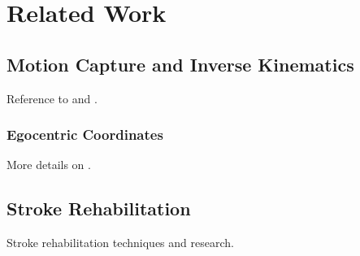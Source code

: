 
\chapter{Related Work} %

\label{Chapter2} %

\section{Motion Capture and Inverse Kinematics}

Reference to \cite{molla2013singularity} and \cite{molla2017egocentric}.

\subsection{Egocentric Coordinates}

More details on \cite{molla2017egocentric}.

\section{Stroke Rehabilitation}

Stroke rehabilitation techniques and research.